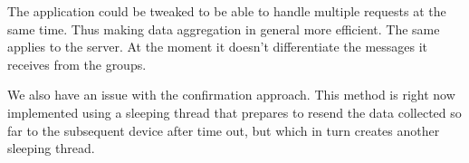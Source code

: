 The application could be tweaked to be able to handle multiple requests at the same time. Thus making data aggregation in general more efficient. The same applies to the server. At the moment it doesn't differentiate the messages it receives from the groups. 

We also have an issue with the confirmation approach. This method is right now implemented using a sleeping thread that prepares to resend the data collected so far to the subsequent device after time out, but which in turn creates another sleeping thread. 
